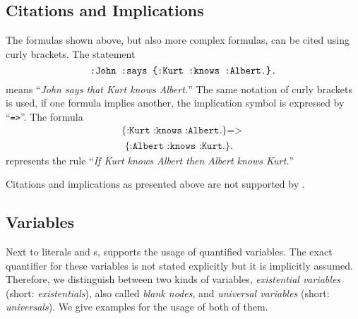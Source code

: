 \subsection{Citations and Implications}\label{reffor}
The formulas shown above, but also more complex formulas, can be cited using curly brackets. 
The statement
\begin{equation}\label{ref}
 \verb!:John :says {:Kurt :knows :Albert.}.!
\end{equation}
means ``\textit{John says that Kurt knows Albert.}''
The same notation of curly brackets is used, if one formula implies another,
 the implication symbol is expressed by ``\verb!=>!''. The formula
%
\begin{multline}%
 \texttt{\{:Kurt :knows :Albert.\} => }%
\\ \texttt{ \{:Albert :knows :Kurt.\}.}\label{implex}
\end{multline}
represents the rule ``\textit{If Kurt knows Albert then Albert knows Kurt.}''

Citations and implications as presented above are not supported by \rdf.

\subsection{Variables}\label{vars}
Next to literals and \iri{}s, \nthree supports the usage of quantified variables. The exact quantifier for these variables is not stated explicitly but it is implicitly assumed. Therefore, we distinguish between two kinds of variables, \emph{existential variables} (short: \emph{existentials}),
also called \emph{blank nodes}, and \emph{universal variables} (short: \emph{universals}).
We give examples for the usage of both of them.

